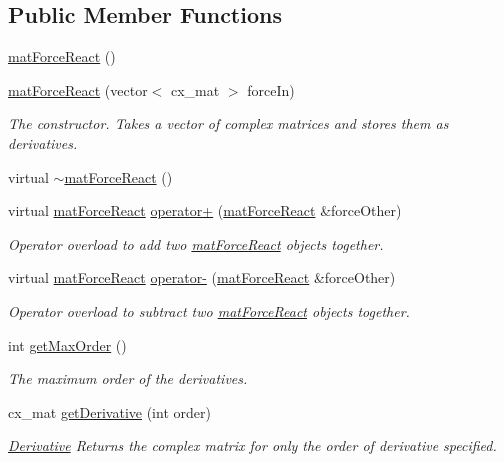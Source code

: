 \subsection*{Public Member Functions}
\begin{DoxyCompactItemize}
\item 
\hyperlink{classmat_force_react_a7ab246a401282eb86db5db5036eedc48}{mat\-Force\-React} ()
\item 
\hyperlink{classmat_force_react_a6e8aa573e40a80cb12c3369f6b3a5c9c}{mat\-Force\-React} (vector$<$ cx\-\_\-mat $>$ force\-In)
\begin{DoxyCompactList}\small\item\em The constructor. Takes a vector of complex matrices and stores them as derivatives. \end{DoxyCompactList}\item 
virtual \hyperlink{classmat_force_react_a4c70511a7f49650d56b0a2ed42bf4f8b}{$\sim$mat\-Force\-React} ()
\item 
virtual \hyperlink{classmat_force_react}{mat\-Force\-React} \hyperlink{classmat_force_react_a8f65b2f67fd6169167cc9735370c99eb}{operator+} (\hyperlink{classmat_force_react}{mat\-Force\-React} \&force\-Other)
\begin{DoxyCompactList}\small\item\em Operator overload to add two \hyperlink{classmat_force_react}{mat\-Force\-React} objects together. \end{DoxyCompactList}\item 
virtual \hyperlink{classmat_force_react}{mat\-Force\-React} \hyperlink{classmat_force_react_ad3be4d341c5fdabf28634cf102a8fbc9}{operator-\/} (\hyperlink{classmat_force_react}{mat\-Force\-React} \&force\-Other)
\begin{DoxyCompactList}\small\item\em Operator overload to subtract two \hyperlink{classmat_force_react}{mat\-Force\-React} objects together. \end{DoxyCompactList}\item 
int \hyperlink{classmat_force_react_aa163ad7393a29dc15fc2c490f88ef5cd}{get\-Max\-Order} ()
\begin{DoxyCompactList}\small\item\em The maximum order of the derivatives. \end{DoxyCompactList}\item 
cx\-\_\-mat \hyperlink{classmat_force_react_a916eb8547f09eb3bf67092f0f64ac59c}{get\-Derivative} (int order)
\begin{DoxyCompactList}\small\item\em \hyperlink{class_derivative}{Derivative} Returns the complex matrix for only the order of derivative specified. \end{DoxyCompactList}\item 

\end{DoxyCompactItemize}

